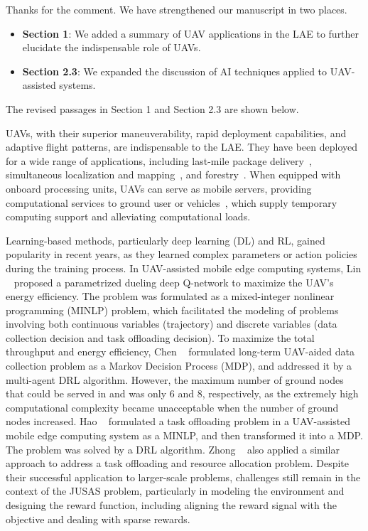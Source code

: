 \begin{revresponse}
	Thanks for the comment.
	We have strengthened our manuscript in two places.
	\begin{itemize}
		\item \textbf{Section 1}: We added a summary of UAV applications in the LAE to further elucidate the indispensable role of UAVs.
		\item \textbf{Section 2.3}: We expanded the discussion of AI techniques applied to UAV-assisted systems.
	\end{itemize}
	The revised passages in Section 1 and Section 2.3 are shown below.
	\begin{changes}
		UAVs, with their superior maneuverability, rapid deployment capabilities, and adaptive flight patterns, are indispensable to the LAE.
		They have been deployed for a wide range of applications, including last-mile package delivery~\cite{b-logistics}, simultaneous localization and mapping~\cite{SLAM}, and forestry~\cite{b-agriculture,none-river}.
		When equipped with onboard processing units, UAVs can serve as mobile servers, providing computational services to ground user or vehicles~\cite{a-constspeed2,IoV,b-DL,liao2024energy}, which supply temporary computing support and alleviating computational loads.
	\end{changes}
	\begin{changes}
		Learning-based methods, particularly deep learning (DL) and RL, gained popularity in recent years, as they learned complex parameters or action policies during the training process.
		In UAV-assisted mobile edge computing systems, Lin \etal~\cite{b-DL} proposed a parametrized dueling deep Q-network to maximize the UAV's energy efficiency.
		The problem was formulated as a mixed-integer nonlinear programming (MINLP) problem, which facilitated the modeling of problems involving both continuous variables (\eg trajectory) and discrete variables (\eg data collection decision and task offloading decision).
		To maximize the total throughput and energy efficiency, Chen \etal~\cite{b-RL} formulated long-term UAV-aided data collection problem as a Markov Decision Process (MDP), and addressed it by a multi-agent DRL algorithm.
		However, the maximum number of ground nodes that could be served in \cite{b-DL} and \cite{b-RL} was only 6 and 8, respectively, as the extremely high computational complexity became unacceptable when the number of ground nodes increased.
		Hao \etal~\cite{hao-minlp} formulated a task offloading problem in a UAV-assisted mobile edge computing system as a MINLP, and then transformed it into a MDP.
		The problem was solved by a DRL algorithm.
		Zhong \etal~\cite{zhong-minlp} also applied a similar approach to address a task offloading and resource allocation problem.
		Despite their successful application to larger-scale problems, challenges still remain in the context of the JUSAS problem, particularly in modeling the environment and designing the reward function, including aligning the reward signal with the objective and dealing with sparse rewards.
	\end{changes}
\end{revresponse}

